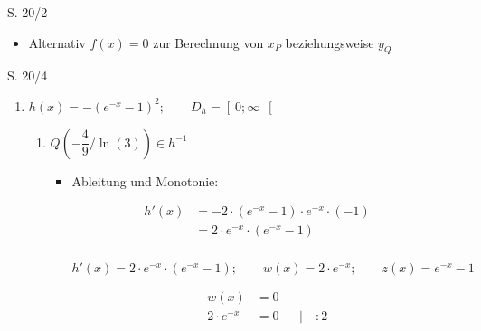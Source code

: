 \begin{Exercise}{S. 20/2}{}
\begin{enumerate}
\begin{enumerate}[label=\alph*)]
{\begin{itemize}[leftmargin=*]
{\begin{align*}
                            t &= 2 &&
                        \end{align*}\\[-2.0ex]
                        $\Rightarrow \quad \uuline{f_{T}(x) = \dfrac{1}{2} x + 2}$\\[-2.0ex]
                        }
                    \item Alternativ $f(x) = 0$ zur Berechnung von $x_{P}$ beziehungsweise $y_{Q}$
                 \end{itemize}
                }
        \end{enumerate}
    \end{enumerate}
\end{Exercise}

\begin{Exercise}{S. 20/4}{}
    \begin{enumerate}[leftmargin=*]
        \item [4.] {
            $h(x) = -\left(e^{-x} - 1\right)^{2}; \qquad D_{h} = \left[ \ 0; \infty \ \right[$\\[-1.0ex]
            \begin{enumerate}[label=\alph*), leftmargin=*]
            \item[a)] {
                $Q(-\dfrac{4}{9} / \ln(3)) \in h^{-1}$\\[-2.0ex]
                \begin{itemize}[leftmargin=*]
                    \item Ableitung und Monotonie: \\[-1.0ex]{
                        \vspace{-2.0ex}
                        \begin{align*}
                            h'(x) &= -2 \cdot \left(e^{-x} - 1\right) \cdot e^{-x} \cdot (-1) &&\\[1.5ex]
                            &= 2 \cdot e^{-x} \cdot \left(e^{-x} - 1\right) &
                        \end{align*}\\[-2.0ex]
                        $h'(x) = 2 \cdot e^{-x} \cdot \left(e^{-x} - 1\right); \qquad w(x) = 2 \cdot e^{-x}; \qquad z(x) = e^{-x} - 1$\\[-2.0ex]
                        \begin{minipage}[t]{0.35\linewidth}
                            \begin{align*}
                                w(x) &= 0 &&\\[2.0ex]
                                2 \cdot e^{-x} &= 0 &&| \quad :2\\[1.5ex]

\end{align*}
\end{minipage}}
\end{itemize}}
\end{enumerate}}
\end{enumerate}
\end{Exercise}
